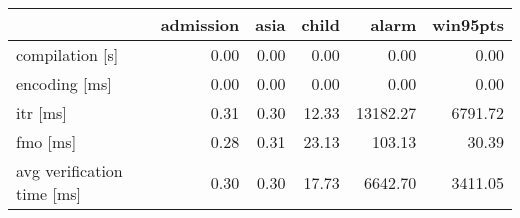 \begin{tabular}{lrrrrr}
\toprule
 & admission & asia & child & alarm & win95pts \\
\midrule
compilation [s] & 0.00 & 0.00 & 0.00 & 0.00 & 0.00 \\
encoding [ms] & 0.00 & 0.00 & 0.00 & 0.00 & 0.00 \\
itr [ms] & 0.31 & 0.30 & 12.33 & 13182.27 & 6791.72 \\
fmo [ms] & 0.28 & 0.31 & 23.13 & 103.13 & 30.39 \\
avg verification time [ms] & 0.30 & 0.30 & 17.73 & 6642.70 & 3411.05 \\
\bottomrule
\end{tabular}
